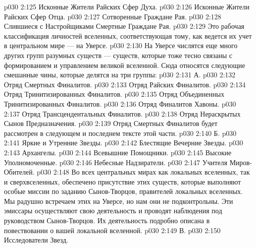 \vs p030 2:125 \bibnobreakspace Исконные Жители Райских Сфер Духа.
\vs p030 2:126 \bibnobreakspace Исконные Жители Райских Сфер Отца.
\vs p030 2:127 \bibnobreakspace Сотворенные Граждане Рая.
\vs p030 2:128 \bibnobreakspace Слившиеся с Настройщиками Смертные Граждане Рая.
\vs p030 2:129 \pc Это рабочая классификация личностей вселенных, соответствующая тому, как ведется их учет в центральном мире --- на Уверсе.
\vs p030 2:130 \pc {} На Уверсе числятся еще много других групп разумных существ --- существ, которые тоже тесно связаны с формированием и управлением великой вселенной. Сюда относятся следующие смешанные чины, которые делятся на три группы:
\vs p030 2:131 \pc А. 
\vs p030 2:132 \bibnobreakspace Отряд Смертных Финалитов.
\vs p030 2:133 \bibnobreakspace Отряд Райских Финалитов.
\vs p030 2:134 \bibnobreakspace Отряд Тринитизированных Финалитов.
\vs p030 2:135 \bibnobreakspace Отряд Объединенных Тринитизированных Финалитов.
\vs p030 2:136 \bibnobreakspace Отряд Финалитов Хавоны.
\vs p030 2:137 \bibnobreakspace Отряд Трансцендентальных Финалитов.
\vs p030 2:138 \bibnobreakspace Отряд Нераскрытых Сынов Предназначения.
\vs p030 2:139 \pc Отряд Смертных Финалитов будет рассмотрен в следующем и последнем тексте этой части.
\vs p030 2:140 \pc Б. 
\vs p030 2:141 \bibnobreakspace Яркие и Утренние Звезды.
\vs p030 2:142 \bibnobreakspace Блестящие Вечерние Звезды.
\vs p030 2:143 \bibnobreakspace Архангелы.
\vs p030 2:144 \bibnobreakspace Всевышние Помощники.
\vs p030 2:145 \bibnobreakspace Высокие Уполномоченные.
\vs p030 2:146 \bibnobreakspace Небесные Надзиратели.
\vs p030 2:147 \bibnobreakspace Учителя Миров\hyp{}Обителей.
\vs p030 2:148 \pc Во всех центральных мирах как локальных вселенных, так и сверхвселенных, обеспечено присутствие этих существ, которые выполняют особые миссии по заданию Сынов\hyp{}Творцов, правителей локальных вселенных. Мы радушно встречаем этих  на Уверсе, но нам они не подконтрольны. Эти эмиссары осуществляют свою деятельность и проводят наблюдения под руководством Сынов\hyp{}Творцов. Их деятельность подробно описана в повествовании о вашей локальной вселенной.
\vs p030 2:149 \pc В. 
\vs p030 2:150 \bibnobreakspace Исследователи Звезд.
